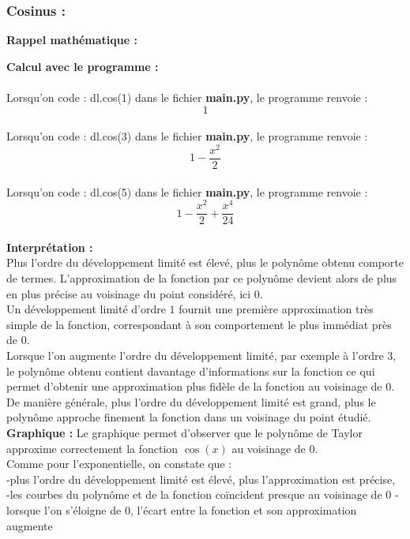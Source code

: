 \documentclass{article}
\begin{document}
\subsubsection{Cosinus :}
\textbf{Rappel mathématique : } \\

\textbf{Calcul avec le programme :} \\
\\
Lorsqu'on code : dl.cos(1) dans le fichier \textbf{main.py}, le programme renvoie : $$1$$ \\
Lorsqu'on code : dl.cos(3) dans le fichier \textbf{main.py}, le programme renvoie : 
$$1-\frac{x^2}{2}$$ \\
Lorsqu'on code : dl.cos(5) dans le fichier \textbf{main.py}, le programme renvoie :
$$1-\frac{x^2}{2}+\frac{x^4}{24}$$ \\
\textbf{Interprétation :} \\
Plus l’ordre du développement limité est élevé, plus le polynôme obtenu comporte de termes. L’approximation de la fonction par ce polynôme devient alors de plus en plus précise au voisinage du point considéré, ici $0$. \\
Un développement limité d’ordre $1$ fournit une première approximation très simple de la fonction, correspondant à son comportement le plus immédiat près de $0$. \\

Lorsque l’on augmente l’ordre du développement limité, par exemple à l’ordre $3$, le polynôme obtenu contient davantage d’informations sur la fonction ce qui permet d’obtenir une approximation plus fidèle de la fonction au voisinage de $0$. \\

De manière générale, plus l’ordre du développement limité est grand, plus le polynôme approche finement la fonction dans un voisinage du point étudié. \\

\textbf{Graphique :}
Le graphique permet d’observer que le polynôme de Taylor approxime correctement la fonction $\cos(x)$ au voisinage de $0$. \\
Comme pour l’exponentielle, on constate que : \\
-plus l’ordre du développement limité est élevé, plus l’approximation est précise, \\
-les courbes du polynôme et de la fonction coïncident presque au voisinage de $0$
-lorsque l’on s’éloigne de 0, l’écart entre la fonction et son approximation augmente
\end{document}
